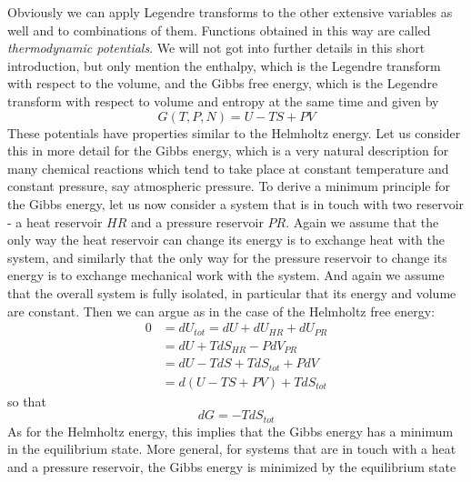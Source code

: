 \documentclass[a4paper, draft]{article}
\theoremstyle{own}
\theoremstyle{remark}
\begin{document}
Obviously we can apply Legendre transforms to the other extensive variables as well and to combinations of them. Functions obtained in this way are called {\em thermodynamic potentials}. We will not got into further details in this short introduction, but only mention the enthalpy, which is the Legendre transform with respect to the volume, and the Gibbs free energy, which is the Legendre transform with respect to volume and entropy at the same time and given by
$$
G(T, P, N) = U - TS + PV
$$
These potentials have properties similar to the Helmholtz energy. Let us consider this in more detail for the Gibbs energy, which is a very natural description for many chemical reactions which tend to take place at constant temperature and constant pressure, say atmospheric pressure. To derive a minimum principle for the Gibbs energy, let us now consider a system that is in touch with two reservoir - a heat reservoir $HR$ and a pressure reservoir $PR$. Again we assume that the only way the heat reservoir can change its energy is to exchange heat with the system, and similarly that the only way for the pressure reservoir to change its energy is to exchange mechanical work with the system. And again we assume that the overall system is fully isolated, in particular that its energy and volume are constant. Then we can argue as in the case of the Helmholtz free energy: 
\begin{align*}
	0 &= dU_{tot} = dU + dU_{HR} + dU_{PR}  \\
	&= dU + T dS_{HR} - P dV_{PR} \\
	&= dU - T dS + T dS_{tot} + P dV \\
	&= d(U - TS + PV) + T dS_{tot}
\end{align*}
so that 
$$
dG = - T dS_{tot}
$$
As for the Helmholtz energy, this implies that the Gibbs energy has a minimum in the equilibrium state. More general, for systems that are in touch with a heat and a pressure reservoir, the Gibbs energy is minimized by the equilibrium state
\end{document}
